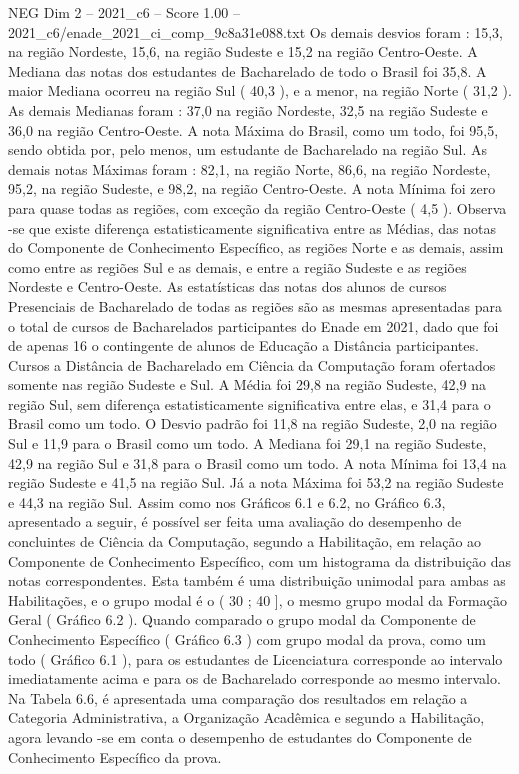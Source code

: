 \begin{textsample}{NEG Dim 2 – 2021\_c6 – Score 1.00 – 2021\_c6/enade\_2021\_ci\_comp\_9c8a31e088.txt}
Os demais desvios foram : 15,3, na região Nordeste, 15,6, na região Sudeste e 15,2 na região Centro-Oeste.
A Mediana das notas dos estudantes de Bacharelado de todo o Brasil foi 35,8.
A maior Mediana ocorreu na região Sul ( 40,3 ), e a menor, na região Norte ( 31,2 ).
As demais Medianas foram : 37,0 na região Nordeste, 32,5 na região Sudeste e 36,0 na região Centro-Oeste.
A nota Máxima do Brasil, como um todo, foi 95,5, sendo obtida por, pelo menos, um estudante de Bacharelado na região Sul.
As demais notas Máximas foram : 82,1, na região Norte, 86,6, na região Nordeste, 95,2, na região Sudeste, e 98,2, na região Centro-Oeste.
A nota Mínima foi zero para quase todas as regiões, com exceção da região Centro-Oeste ( 4,5 ).
Observa -se que existe diferença estatisticamente significativa entre as Médias, das notas do Componente de Conhecimento Específico, as regiões Norte e as demais, assim como entre as regiões Sul e as demais, e entre a região Sudeste e as regiões Nordeste e Centro-Oeste.
As estatísticas das notas dos alunos de cursos Presenciais de Bacharelado de todas as regiões são as mesmas apresentadas para o total de cursos de Bacharelados participantes do Enade em 2021, dado que foi de apenas 16 o contingente de alunos de Educação a Distância participantes.
Cursos a Distância de Bacharelado em Ciência da Computação foram ofertados somente nas região Sudeste e Sul.
A Média foi 29,8 na região Sudeste, 42,9 na região Sul, sem diferença estatisticamente significativa entre elas, e 31,4 para o Brasil como um todo.
O Desvio padrão foi 11,8 na região Sudeste, 2,0 na região Sul e 11,9 para o Brasil como um todo.
A Mediana foi 29,1 na região Sudeste, 42,9 na região Sul e 31,8 para o Brasil como um todo.
A nota Mínima foi 13,4 na região Sudeste e 41,5 na região Sul.
Já a nota Máxima foi 53,2 na região Sudeste e 44,3 na região Sul.
Assim como nos Gráficos 6.1 e 6.2, no Gráfico 6.3, apresentado a seguir, é possível ser feita uma avaliação do desempenho de concluintes de Ciência da Computação, segundo a Habilitação, em relação ao Componente de Conhecimento Específico, com um histograma da distribuição das notas correspondentes.
Esta também é uma distribuição unimodal para ambas as Habilitações, e o grupo modal é o ( 30 ; 40 ], o mesmo grupo modal da Formação Geral ( Gráfico 6.2 ).
Quando comparado o grupo modal da Componente de Conhecimento Específico ( Gráfico 6.3 ) com grupo modal da prova, como um todo ( Gráfico 6.1 ), para os estudantes de Licenciatura corresponde ao intervalo imediatamente acima e para os de Bacharelado corresponde ao mesmo intervalo.
Na Tabela 6.6, é apresentada uma comparação dos resultados em relação a Categoria Administrativa, a Organização Acadêmica e segundo a Habilitação, agora levando -se em conta o desempenho de estudantes do Componente de Conhecimento Específico da prova.

\end{textsample}
